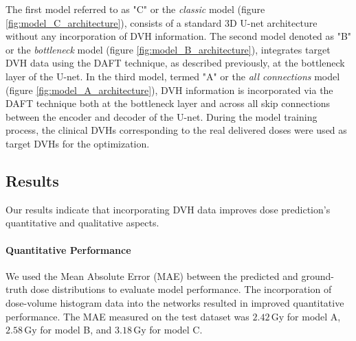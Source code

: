 The first model referred to as "C" or the \textit{classic} model (figure \ref{fig:model_C_architecture}), consists of a standard 3D U-net architecture without any incorporation of DVH information.
The second model denoted as "B" or the \textit{bottleneck} model (figure \ref{fig:model_B_architecture}), integrates target DVH data using the DAFT technique, as described previously, at the bottleneck layer of the U-net.
In the third model, termed "A" or the \textit{all connections} model (figure \ref{fig:model_A_architecture}), DVH information is incorporated via the DAFT technique both at the bottleneck layer and across all skip connections between the encoder and decoder of the U-net.
During the model training process, the clinical DVHs corresponding to the real delivered doses were used as target DVHs for the optimization.

\subsection{Results}
Our results indicate that incorporating DVH data improves dose prediction's quantitative and qualitative aspects.

\paragraph{Quantitative Performance}
We used the Mean Absolute Error (MAE) between the predicted and ground-truth dose distributions to evaluate model performance.
The incorporation of dose-volume histogram data into the networks resulted in improved quantitative performance.
The MAE measured on the test dataset was $2.42\,\text{Gy}$ for model A, $2.58\,\text{Gy}$ for model B, and $3.18\,\text{Gy}$ for model C.

